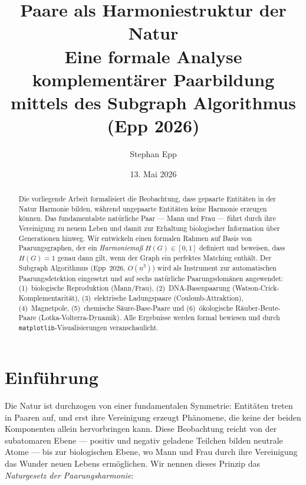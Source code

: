 ﻿\documentclass[a4paper,12pt]{article}
\title{\textbf{Paare als Harmoniestruktur der Natur}\\[0.4em]
\large Eine formale Analyse komplementärer Paarbildung\\
mittels des Subgraph Algorithmus (Epp 2026)}
\author{Stephan Epp}
\date{13. Mai 2026}
\theoremstyle{definition}
\begin{document}
\maketitle
\begin{abstract}
Die vorliegende Arbeit formalisiert die Beobachtung, dass gepaarte Entitäten in der Natur
Harmonie bilden, während ungepaarte Entitäten keine Harmonie erzeugen können.
Das fundamentalste natürliche Paar --- Mann und Frau --- führt durch ihre Vereinigung zu
neuem Leben und damit zur Erhaltung biologischer Information über Generationen hinweg.
Wir entwickeln einen formalen Rahmen auf Basis von Paarungsgraphen, der ein
\emph{Harmoniemaß} $H(G) \in [0,1]$ definiert und beweisen, dass $H(G) = 1$ genau dann
gilt, wenn der Graph ein perfektes Matching enthält.
Der Subgraph Algorithmus (Epp~2026, $O(n^3)$) wird als Instrument zur automatischen
Paarungsdetektion eingesetzt und auf sechs natürliche Paarungsdomänen angewendet:
(1)~biologische Reproduktion (Mann/Frau), (2)~DNA-Basenpaarung (Watson-Crick-Komplementarität),
(3)~elektrische Ladungspaare (Coulomb-Attraktion), (4)~Magnetpole,
(5)~chemische Säure-Base-Paare und (6)~ökologische Räuber-Beute-Paare
(Lotka-Volterra-Dynamik).
Alle Ergebnisse werden formal bewiesen und durch \texttt{matplotlib}-Visualisierungen
veranschaulicht.
\end{abstract}

\tableofcontents
\newpage

\section{Einführung}

Die Natur ist durchzogen von einer fundamentalen Symmetrie: Entitäten treten in Paaren
auf, und erst ihre Vereinigung erzeugt Phänomene, die keine der beiden Komponenten allein
hervorbringen kann. Diese Beobachtung reicht von der subatomaren Ebene --- positiv und
negativ geladene Teilchen bilden neutrale Atome --- bis zur biologischen Ebene, wo Mann und
Frau durch ihre Vereinigung das Wunder neuen Lebens ermöglichen. Wir nennen dieses
Prinzip das \emph{Naturgesetz der Paarungsharmonie}:

\medskip
\centerline{}
\medskip
\end{document}
